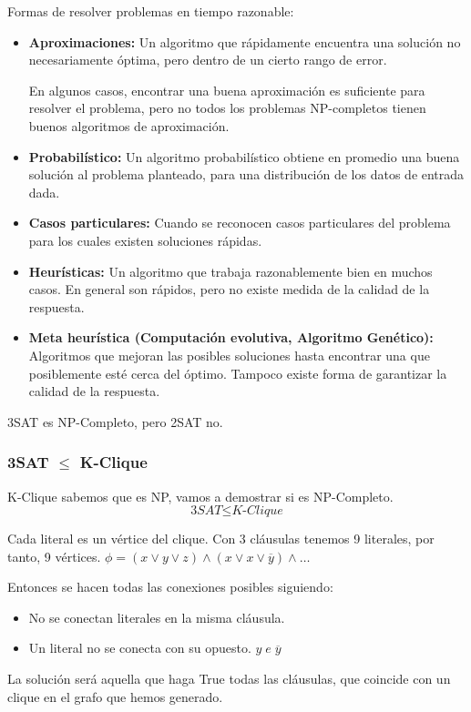 Formas de resolver problemas en tiempo razonable:
\begin{itemize}
  \item \textbf{Aproximaciones:} Un algoritmo que rápidamente encuentra una solución no necesariamente óptima, pero dentro de un cierto rango de error.
  
  En algunos casos, encontrar una buena aproximación es suficiente para resolver el problema, pero no todos los problemas NP-completos tienen buenos algoritmos de aproximación.
  \item \textbf{Probabilístico:} Un algoritmo probabilístico obtiene en promedio una buena solución al problema planteado, para una distribución de los datos de entrada dada.
  \item \textbf{Casos particulares:} Cuando se reconocen casos particulares del problema para los cuales existen soluciones rápidas.
  \item \textbf{Heurísticas:} Un algoritmo que trabaja razonablemente bien en muchos casos. En general son rápidos, pero no existe medida de la calidad de la respuesta.
  \item \textbf{Meta heurística (Computación evolutiva, Algoritmo Genético):} Algoritmos que mejoran las posibles soluciones hasta encontrar una que posiblemente esté cerca del óptimo. Tampoco existe forma de garantizar la calidad de la respuesta.
\end{itemize}

3SAT es NP-Completo, pero 2SAT no.

\subsubsection{3SAT $\leq$ K-Clique}
K-Clique sabemos que es NP, vamos a demostrar si es NP-Completo.
$$\textit{3SAT} \leq \textit{K-Clique}$$

Cada literal es un vértice del clique. Con 3 cláusulas tenemos 9 literales, por tanto, 9 vértices. $\phi=(x\vee y \vee z) \wedge (x\vee x \vee \overline{y}) \wedge \dots$

Entonces se hacen todas las conexiones posibles siguiendo:
\begin{itemize}
  \item No se conectan literales en la misma cláusula.
  \item Un literal no se conecta con su opuesto. $y \; e\; \overline{y}$
\end{itemize}

La solución será aquella que haga True todas las cláusulas, que coincide con un clique en el grafo que hemos generado.

